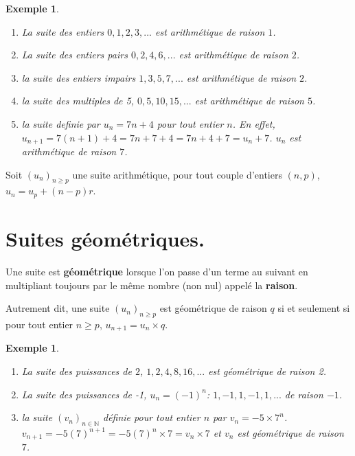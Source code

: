 \documentclass[a4paper,11pt]{article}
\theoremstyle{break}
\newcounter{enonce}
\newtheorem{exemple}[enonce]{Exemple}
\begin{document}
   \begin{exemple}
    
  \begin{enumerate}
   \item La suite des entiers $0,1,2,3,...$ est arithmétique de raison $1$.
   \item La suite des entiers pairs $0,2,4,6,...$ est arithmétique de raison $2$.
   \item la suite des entiers impairs $1,3,5,7,...$ est arithmétique de raison $2$.
   \item la suite des multiples de 5, $0,5,10,15,...$ est arithmétique de raison $5$.
   \item la suite definie par $u_n=7n+4$ pour tout entier $n$. En effet, 
   $u_{n+1}=7(n+1)+4=7n+7+4=7n+4+7=u_n+7$. $u_n$ est arithmétique de raison $7$.
  \end{enumerate}  
   \end{exemple}
   
   \begin{theorem}
    Soit $(u_n)_{n \geq p}$ une suite arithmétique, pour tout couple d'entiers $(n,p)$, $u_n=u_p+(n-p)r$.
   \end{theorem}
   
     \section{Suites géométriques.}
  \begin{definition} 
    
   Une suite est \textbf{géométrique} lorsque l'on passe d'un terme au suivant en multipliant toujours 
   par le même nombre (non nul) appelé la \textbf{raison}.
   
   Autrement dit, une suite $(u_n)_{n \geq p}$ est géométrique de raison $q$ si et seulement si 
   pour tout entier $n \geq p$, $u_{n+1}=u_n \times q$.
   \end{definition}
   
   \begin{exemple}
    
  \begin{enumerate}
   \item La suite des puissances de $2$, $1,2,4,8,16,...$ est géométrique de raison 2.
   \item La suite des puissances de -1, $u_n=(-1)^n$: $1,-1,1,-1,1,...$ de raison $-1$.
   \item la suite $(v_n)_{n \in \mathbb{N}}$ définie pour tout entier $n$ par $v_n=-5 \times 7^n$.
   $v_{n+1}=-5 (7)^{n+1}=-5(7)^n \times 7=v_n \times 7$ et $v_n$ est géométrique de raison $7$.
  \end{enumerate}  
   \end{exemple}
   
\end{document}
